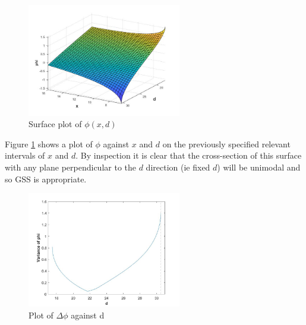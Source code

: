 \documentclass[a4paper]{article}
\begin{document}
\begin{enumerate}
    \begin{figure}[H]
    \centering
    \includegraphics[width=0.60\textwidth]{Q6_ii_a.jpg}
    \caption{Surface plot of $\phi(x,d)$}
    \label{xdphi}
    \end{figure}
    
    Figure \ref{xdphi} shows a plot of $\phi$ against $x$ and $d$ on the previously specified relevant intervals of $x$ and $d$. By inspection it is clear that the cross-section of this surface with any plane perpendicular to the $d$ direction (ie fixed $d$) will be unimodal and so GSS is appropriate.
    
    \begin{figure}[H]
    \centering
    \includegraphics[width=0.60\textwidth]{Q6_ii_b.jpg}
    \caption{Plot of $\Delta\phi$ against d}
    \label{dvarphi}
    \end{figure}
    

\end{enumerate}
\end{document}

